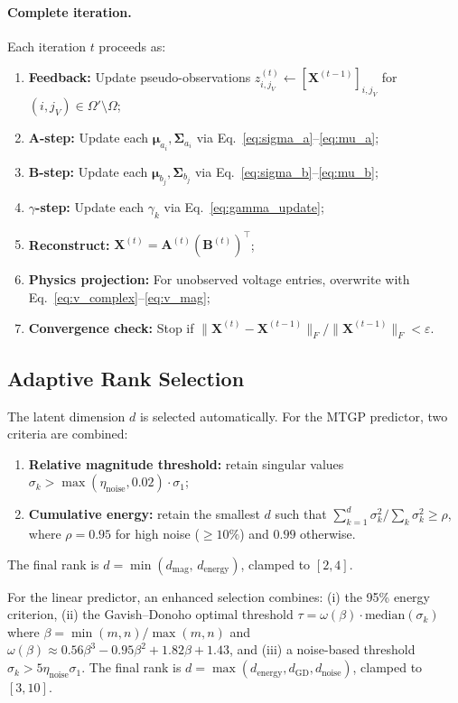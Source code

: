 \documentclass[11pt,a4paper]{article}
\begin{document}
\paragraph{Complete iteration.}  Each iteration $t$ proceeds as:
\begin{enumerate}[nosep]
  \item \textbf{Feedback:} Update pseudo-observations $z_{i,j_V}^{(t)} \leftarrow [\bm{X}^{(t-1)}]_{i,j_V}$ for $(i,j_V) \in \Omega' \setminus \Omega$;
  \item \textbf{A-step:} Update each $\bm{\mu}_{a_i}, \bm{\Sigma}_{a_i}$ via Eq.~\eqref{eq:sigma_a}--\eqref{eq:mu_a};
  \item \textbf{B-step:} Update each $\bm{\mu}_{b_j}, \bm{\Sigma}_{b_j}$ via Eq.~\eqref{eq:sigma_b}--\eqref{eq:mu_b};
  \item \textbf{$\gamma$-step:} Update each $\gamma_k$ via Eq.~\eqref{eq:gamma_update};
  \item \textbf{Reconstruct:} $\bm{X}^{(t)} = \bm{A}^{(t)}(\bm{B}^{(t)})^\top$;
  \item \textbf{Physics projection:} For unobserved voltage entries, overwrite with Eq.~\eqref{eq:v_complex}--\eqref{eq:v_mag};
  \item \textbf{Convergence check:} Stop if $\|\bm{X}^{(t)} - \bm{X}^{(t-1)}\|_F / \|\bm{X}^{(t-1)}\|_F < \varepsilon$.
\end{enumerate}

\subsection{Adaptive Rank Selection}
The latent dimension $d$ is selected automatically. For the MTGP predictor, two criteria are combined:
\begin{enumerate}[nosep]
  \item \textbf{Relative magnitude threshold:} retain singular values $\sigma_k > \max(\eta_{\text{noise}}, 0.02)\cdot \sigma_1$;
  \item \textbf{Cumulative energy:} retain the smallest $d$ such that $\sum_{k=1}^{d}\sigma_k^{2} / \sum_{k}\sigma_k^{2} \ge \rho$, where $\rho = 0.95$ for high noise ($\ge 10\%$) and $0.99$ otherwise.
\end{enumerate}
The final rank is $d = \min(d_{\text{mag}},\, d_{\text{energy}})$, clamped to $[2, 4]$.

For the linear predictor, an enhanced selection combines: (i) the 95\% energy criterion, (ii) the Gavish--Donoho optimal threshold $\tau = \omega(\beta)\cdot \mathrm{median}(\sigma_k)$ where $\beta = \min(m,n)/\max(m,n)$ and $\omega(\beta) \approx 0.56\beta^3 - 0.95\beta^2 + 1.82\beta + 1.43$, and (iii) a noise-based threshold $\sigma_k > 5\eta_{\text{noise}}\sigma_1$. The final rank is $d = \max(d_{\text{energy}}, d_{\text{GD}}, d_{\text{noise}})$, clamped to $[3, 10]$.
\end{document}
